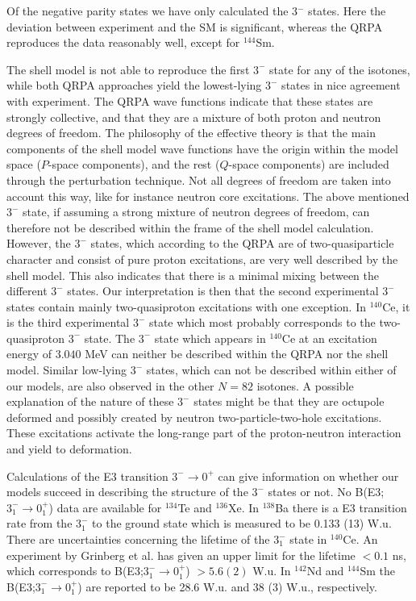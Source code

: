 Of the negative parity states we have only calculated the 3$^{-}$ states. 
Here the deviation between experiment and the SM 
is significant, whereas the QRPA
reproduces the data reasonably well, except for $^{144}$Sm. 

The shell model is not able to reproduce the first $3^{-}$ state for any
of the isotones, while both QRPA approaches yield the lowest-lying $3^{-}$
states in nice agreement with experiment. The QRPA wave functions 
indicate that
these states are strongly collective, and that they are a mixture of both 
proton and 
neutron degrees of freedom. 
The philosophy of the effective theory is 
that the main components of the shell 
model wave functions have the origin  
within the model space ($P$-space components), 
and the rest ($Q$-space components) are included 
through the perturbation technique.
Not all degrees of freedom are taken into account this way, like for instance 
neutron core excitations. The above mentioned $3^{-}$ state, 
if assuming a strong mixture 
of neutron degrees of freedom, 
can therefore not be described within the frame of 
the shell model calculation. 
However, the $3^{-}$ states, which according to the 
QRPA are of two-quasiparticle character and consist of pure
proton excitations, are very well described by the shell model. 
This also indicates
that there is a minimal mixing between the different $3^{-}$ states. Our 
interpretation is then that the second experimental $3^{-}$ states contain
mainly two-quasiproton excitations with one exception. In $^{140}$Ce, 
it is the third experimental $3^{-}$ state which most probably corresponds to 
the two-quasiproton $3^{-}$ state. The $3^{-}$ state which appears in 
$^{140}$Ce at an excitation energy of $3.040$ MeV can neither be described 
within the QRPA nor the shell model. Similar low-lying $3^{-}$ states, which
can not be described within either of our models, are also observed in the 
other $N=82$ isotones. A possible explanation of the nature of these $3^{-}$ 
states might be that they are octupole deformed and possibly created by neutron
two-particle-two-hole excitations. These excitations activate the 
long-range part of the proton-neutron interaction and yield to deformation.

Calculations of the E3 transition $3^{-} \rightarrow 0^{+}$ can give 
information on whether our models succeed in describing the structure of the 
$3^{-}$ states or not. No B(E3;$3^{-}_{1} \rightarrow 0^{+}_{1}$) data are 
available for $^{134}$Te and $^{136}$Xe. In $^{138}$Ba there is a E3 
transition rate 
from the $3^{-}_{1}$ to the ground state which is measured to be 0.133 (13) 
W.u. There are uncertainties concerning the lifetime of the $3^{-}_{1}$ state
in $^{140}$Ce. An experiment by Grinberg et al. \cite{g93:E3} has 
given an upper limit for the lifetime $< 0.1$ ns, which 
corresponds to B(E3;$3^{-}_{1} \rightarrow 0^{+}_{1}$) $> 5.6 (2)$ W.u. In
$^{142}$Nd and $^{144}$Sm the B(E3;$3^{-}_{1} \rightarrow 0^{+}_{1}$) are
reported to be 28.6 W.u. and 38 (3) W.u., respectively.

